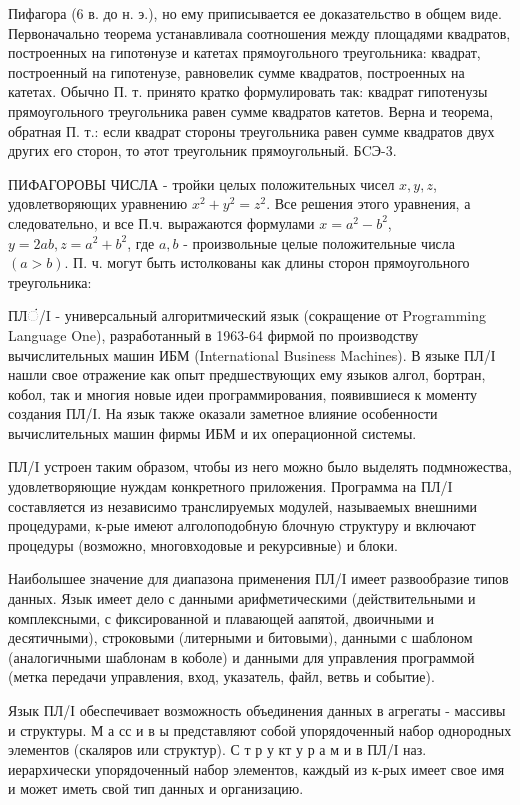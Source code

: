 \documentclass[10pt]{article}
\begin{document}
Пифагора (6 в. до н. э.), но ему приписывается ее доказательство в общем виде. Первоначально теорема устанавливала соотношения между площадями квадратов, построенных на гипотөнузе и катетах прямоугольного треугольника: квадрат, построенный на гипотенузе, равновелик сумме квадратов, построенных на катетах. Обычно П. т. принято кратко формулировать так: квадрат гипотенузы прямоугольного треугольника равен сумме квадратов катетов. Верна и теорема, обратная П. т.: если квадрат стороны треугольника равен сумме квадратов двух других его сторон, то әтот треугольник прямоугольный. БCЭ-3.



ПИФАГОРОВЫ ЧИСЛА - тройки целых положительных чисел $x, y, z$, удовлетворяющих уравнению $x^{2}+y^{2}=z^{2}$. Все решения этого уравнения, а следовательно, и все П.ч. выражаются формулами $x=a^{2}-b^{2}$, $y=2 a b, z=a^{2}+b^{2}$, где $a, b$ - произвольные целые положительные числа $(a>b)$. П. ч. могут быть истолкованы как длины сторон прямоугольного треугольника:



ПЛં/I - универсальный алгоритмический язык (сокращение от Programming Language One), разработанный в 1963-64 фирмой по производству вычислительных машин ИБМ (International Business Machines). В языке ПЛ/І нашли свое отражение как опыт предшествующих ему языков алгол, бортран, кобол, так и многия новые идеи программирования, появившиеся к моменту создания ПЛ/І. На язык также оказали заметное влияние особенности вычислительных машин фирмы ИБМ и их операционной системы.



ПЛ/I устроен таким образом, чтобы из него можно было выделять подмножества, удовлетворяющие нуждам конкретного приложения. Программа на ПЛ/I составляется из независимо транслируемых модулей, называемых внешними процедурами, к-рые имеют алголоподобную блочную структуру и включают процедуры (возможно, многовходовые и рекурсивные) и блоки.



Наиболышее значение для диапазона применения ПЛ/І имеет развообразие типов данных. Язык имеет дело с данными арифметическими (действительными и комплексными, с фиксированной и плавающей аапятой, двоичными и десятичными), строковыми (литерными и битовыми), данными с шаблоном (аналогичными шаблонам в коболе) и данными для управления программой (метка передачи управления, вход, указатель, файл, ветвь и событие).



Язык ПЛ/І обеспечивает возможность объединения данных в агрегаты - массивы и структуры. М а сс и в ы представляют собой упорядоченный набор однородных элементов (скаляров или структур). С т р у кт у р а м и в ПЛ/І наз. иерархически упорядоченный набор элементов, каждый из к-рых имеет свое имя и может иметь свой тип данных и организацию.
\end{document}
